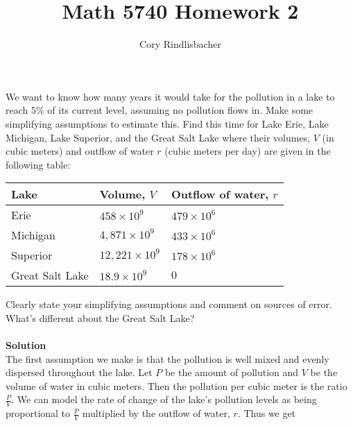 \documentclass[12pt]{article}
\newenvironment{exercise}[2][Exercise]{\begin{trivlist}
\item[\hskip \labelsep {\bfseries #1}\hskip \labelsep {\bfseries #2.}]}{\end{trivlist}}
\begin{document}
 
 
 
\title{Math 5740 Homework 2}%
\author{Cory Rindlisbacher\\ %
} %
 
\maketitle
 
\begin{exercise}{1} 
We want to know how many years it would take for the pollution in a lake to reach $5\%$ of its current level, assuming no pollution flows in. Make some simplifying assumptions to estimate this. Find this time for Lake Erie, Lake Michigan, Lake Superior, and the Great Salt Lake where their volumes, $V$ (in cubic meters) and outflow of water $r$ (cubic meters per day) are given in the following table: \\
\begin{center}
	\begin{tabular}{lll}
		Lake & Volume, $V$ & Outflow of water, $r$ \\ \hline
		Erie & $458 \times 10^9$ & $479 \times 10^6$ \\
		Michigan & $4,871 \times 10^9$ & $433 \times 10^6$ \\
		Superior & $12,221 \times 10^9$ & $178 \times 10^6$ \\
		Great Salt Lake & $18.9 \times 10^9$ & $0$ \\
	\end{tabular}
\end{center}

Clearly state your simplifying assumptions and comment on sources of error. What's different about the Great Salt Lake?
\\
\\
\textbf{Solution}\\
The first assumption we make is that the pollution is well mixed and evenly dispersed throughout the lake. Let $P$ be the amount of pollution and $V$ be the volume of water in cubic meters. Then the pollution per cubic meter is the ratio $\frac{P}{V}$. We can model the rate of change of the lake's pollution levels as being proportional to $\frac{P}{V}$ multiplied by the outflow of water, $r$. Thus we get 


\end{exercise}
\end{document}
